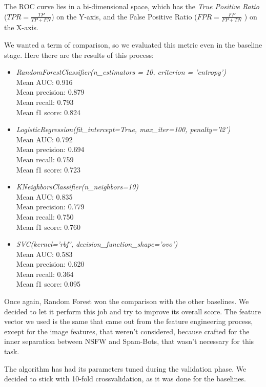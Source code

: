 The ROC curve lies in a bi-dimensional space, which has the \textit{True Positive Ratio} ($ TPR =  \frac{TP}{TP+FN}$) on the Y-axis, and the False Positive Ratio ($ FPR =  \frac{FP}{FP+TN}$ ) on the X-axis.

We wanted a term of comparison, so we evaluated this metric even in the baseline stage. Here there are the results of this process:
\begin{itemize}
	\item[\PencilRight] \textit{RandomForestClassifier(n\_estimators = 10, criterion = 'entropy')}\\
	Mean AUC: 0.916\\
	Mean precision: 0.879\\
	Mean recall: 0.793\\
	Mean f1 score: 0.824
	\item[\PencilRight]\textit{LogisticRegression(fit\_intercept=True, max\_iter=100, penalty='l2')}\\
	Mean AUC: 0.792\\
	Mean precision: 0.694\\
	Mean recall: 0.759\\
	Mean f1 score: 0.723
	\item[\PencilRight]\textit{KNeighborsClassifier(n\_neighbors=10)}\\
	Mean AUC: 0.835\\
	Mean precision: 0.779\\
	Mean recall: 0.750\\
	Mean f1 score: 0.760
	\item[\PencilRight]\textit{SVC(kernel='rbf', decision\_function\_shape='ovo')}\\
	Mean AUC: 0.583\\
	Mean precision: 0.620\\
	Mean recall: 0.364\\
	Mean f1 score: 0.095
\end{itemize}
 Once again, Random Forest won the comparison with the other baselines.
We decided to let it perform this job and try to improve its overall score.
The feature vector we used is the same that came out from the feature engineering process\label{feature_vector}, except for the image features, that weren't considered, because crafted for the inner separation between NSFW and Spam-Bots, that wasn't necessary for this task.

The algorithm has had its parameters tuned during the validation phase.
We decided to stick with 10-fold crossvalidation, as it was done for the baselines.


